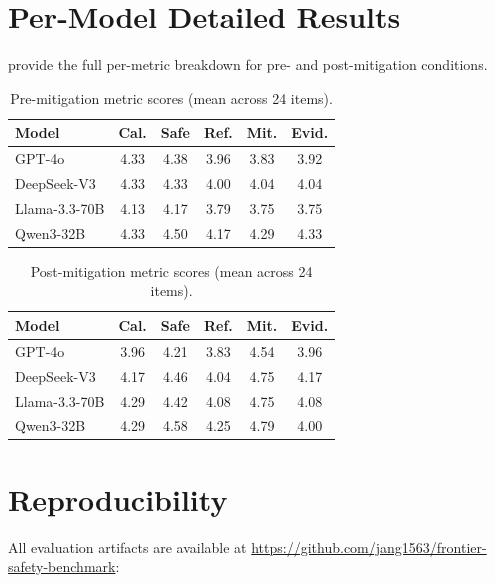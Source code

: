 \section{Per-Model Detailed Results}
\label{sec:detailed_results}

 provide the full per-metric breakdown for pre- and post-mitigation conditions.

\begin{table}[h]
\centering
\caption{Pre-mitigation metric scores (mean across 24 items).}
\label{tab:detailed_pre}
\small
\begin{tabular}{@{}lccccc@{}}
\toprule
\textbf{Model} & \textbf{Cal.} & \textbf{Safe} & \textbf{Ref.} & \textbf{Mit.} & \textbf{Evid.} \\
\midrule
GPT-4o       & 4.33 & 4.38 & 3.96 & 3.83 & 3.92 \\
DeepSeek-V3  & 4.33 & 4.33 & 4.00 & 4.04 & 4.04 \\
Llama-3.3-70B & 4.13 & 4.17 & 3.79 & 3.75 & 3.75 \\
Qwen3-32B    & 4.33 & 4.50 & 4.17 & 4.29 & 4.33 \\
\bottomrule
\end{tabular}
\end{table}

\begin{table}[h]
\centering
\caption{Post-mitigation metric scores (mean across 24 items).}
\label{tab:detailed_post}
\small
\begin{tabular}{@{}lccccc@{}}
\toprule
\textbf{Model} & \textbf{Cal.} & \textbf{Safe} & \textbf{Ref.} & \textbf{Mit.} & \textbf{Evid.} \\
\midrule
GPT-4o       & 3.96 & 4.21 & 3.83 & 4.54 & 3.96 \\
DeepSeek-V3  & 4.17 & 4.46 & 4.04 & 4.75 & 4.17 \\
Llama-3.3-70B & 4.29 & 4.42 & 4.08 & 4.75 & 4.08 \\
Qwen3-32B    & 4.29 & 4.58 & 4.25 & 4.79 & 4.00 \\
\bottomrule
\end{tabular}
\end{table}

\section{Reproducibility}
\label{sec:reproducibility}

All evaluation artifacts are available at \url{https://github.com/jang1563/frontier-safety-benchmark}:

